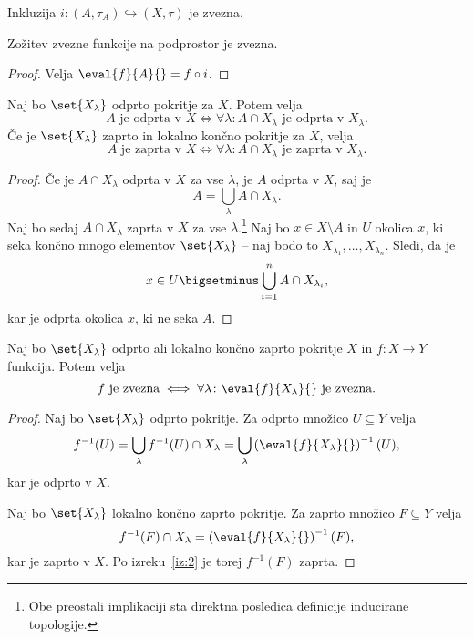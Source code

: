 \obvs

\begin{trditev}
Inkluzija $i \colon (A, \tau_A) \hookrightarrow (X, \tau)$ je
zvezna.
\end{trditev}

\obvs

\begin{trditev}
Zožitev zvezne funkcije na podprostor je zvezna.
\end{trditev}

\begin{proof}
Velja $\eval{f}{A}{} = f \circ i$.
\end{proof}

\begin{izrek}\label{iz:2}
Naj bo $\set{X_\lambda}$ odprto pokritje za $X$. Potem velja
\[
\text{$A$ je odprta v $X$} \iff \forall \lambda \colon
\text{$A \cap X_\lambda$ je odprta v $X_\lambda$}.
\]
Če je $\set{X_\lambda}$ zaprto in lokalno končno pokritje za $X$,
velja
\[
\text{$A$ je zaprta v $X$} \iff \forall \lambda \colon
\text{$A \cap X_\lambda$ je zaprta v $X_\lambda$}.
\]
\end{izrek}

\begin{proof}
Če je $A \cap X_\lambda$ odprta v $X$ za vse $\lambda$, je $A$
odprta v $X$, saj je
\[
A = \bigcup_\lambda A \cap X_\lambda.
\]
Naj bo sedaj $A \cap X_\lambda$ zaprta v $X$ za vse $\lambda$.\footnote{
Obe preostali implikaciji sta direktna posledica definicije
inducirane topologije.} Naj bo $x \in X \setminus A$ in $U$ okolica
$x$, ki seka končno mnogo elementov $\set{X_\lambda}$ -- naj bodo
to $X_{\lambda_1}, \dots, X_{\lambda_n}$. Sledi, da je
\[
x \in U \bigsetminus \bigcup_{i=1}^n A \cap X_{\lambda_i},
\]
kar je odprta okolica $x$, ki ne seka $A$.
\end{proof}

\begin{izrek}
Naj bo $\set{X_\lambda}$ odprto ali lokalno končno zaprto pokritje
$X$ in $f \colon X \to Y$ funkcija. Potem velja
\[
\text{$f$ je zvezna} \iff \forall \lambda \colon
\text{$\eval{f}{X_\lambda}{}$ je zvezna}.
\]
\end{izrek}

\begin{proof}
Naj bo $\set{X_\lambda}$ odprto pokritje. Za odprto množico
$U \subseteq Y$ velja
\[
f^{-1}(U) =
\bigcup_\lambda f^{-1}(U) \cap X_\lambda =
\bigcup_\lambda \left(\eval{f}{X_\lambda}{}\right)^{-1}(U),
\]
kar je odprto v $X$.

Naj bo $\set{X_\lambda}$ lokalno končno zaprto pokritje. Za zaprto
množico $F \subseteq Y$ velja
\[
f^{-1}(F) \cap X_\lambda =
\left(\eval{f}{X_\lambda}{}\right)^{-1}(F),
\]
kar je zaprto v $X$. Po izreku~\ref{iz:2} je torej $f^{-1}(F)$
zaprta.
\end{proof}

